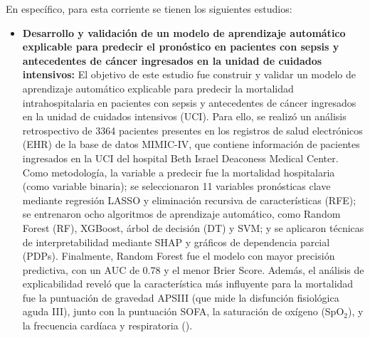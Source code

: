 En específico, para esta corriente se tienen los siguientes estudios:
\begin{itemize}
\item \textbf{Desarrollo y validación de un modelo de aprendizaje automático explicable para predecir el pronóstico en pacientes con sepsis y antecedentes de cáncer ingresados en la unidad de cuidados intensivos:} El objetivo de este estudio fue construir y validar un modelo de aprendizaje automático explicable para predecir la mortalidad intrahospitalaria en pacientes con sepsis y antecedentes de cáncer ingresados en la unidad de cuidados intensivos (UCI). Para ello, se realizó un análisis retrospectivo de 3364 pacientes presentes en los registros de salud electrónicos (EHR) de la base de datos MIMIC-IV, que contiene información de pacientes ingresados en la UCI del hospital Beth Israel Deaconess Medical Center. Como metodología, la variable a predecir fue la mortalidad hospitalaria (como variable binaria); se seleccionaron 11 variables pronósticas clave mediante regresión LASSO y eliminación recursiva de características (RFE); se entrenaron ocho algoritmos de aprendizaje automático, como Random Forest (RF), XGBoost, árbol de decisión (DT) y SVM; y se aplicaron técnicas de interpretabilidad mediante SHAP y gráficos de dependencia parcial (PDPs). Finalmente, Random Forest fue el modelo con mayor precisión predictiva, con un AUC de 0.78 y el menor Brier Score. Además, el análisis de explicabilidad reveló que la característica más influyente para la mortalidad fue la puntuación de gravedad APSIII (que mide la disfunción fisiológica aguda III), junto con la puntuación SOFA, la saturación de oxígeno (SpO$_2$), y la frecuencia cardíaca y respiratoria (\cite{article1}).

\end{itemize}
